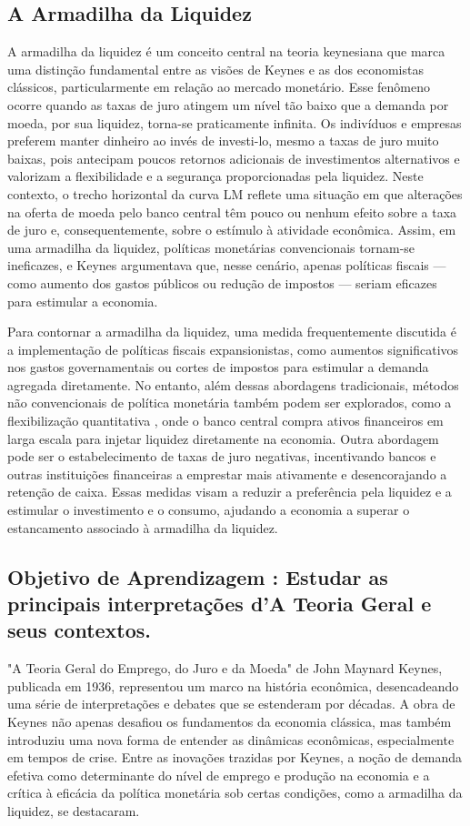 \documentclass[12pt]{article}
\begin{document}
\subsection{\textbf{A Armadilha da Liquidez}}
A armadilha da liquidez é um conceito central na teoria keynesiana que marca uma distinção fundamental entre as visões de Keynes e as dos economistas clássicos, particularmente em relação ao mercado monetário. Esse fenômeno ocorre quando as taxas de juro atingem um nível tão baixo que a demanda por moeda, por sua liquidez, torna-se praticamente infinita. Os indivíduos e empresas preferem manter dinheiro ao invés de investi-lo, mesmo a taxas de juro muito baixas, pois antecipam poucos retornos adicionais de investimentos alternativos e valorizam a flexibilidade e a segurança proporcionadas pela liquidez. Neste contexto, o trecho horizontal da curva LM reflete uma situação em que alterações na oferta de moeda pelo banco central têm pouco ou nenhum efeito sobre a taxa de juro e, consequentemente, sobre o estímulo à atividade econômica. Assim, em uma armadilha da liquidez, políticas monetárias convencionais tornam-se ineficazes, e Keynes argumentava que, nesse cenário, apenas políticas fiscais — como aumento dos gastos públicos ou redução de impostos — seriam eficazes para estimular a economia.

Para contornar a armadilha da liquidez, uma medida frequentemente discutida é a implementação de políticas fiscais expansionistas, como aumentos significativos nos gastos governamentais ou cortes de impostos para estimular a demanda agregada diretamente. No entanto, além dessas abordagens tradicionais, métodos não convencionais de política monetária também podem ser explorados, como a flexibilização quantitativa , onde o banco central compra ativos financeiros em larga escala para injetar liquidez diretamente na economia. Outra abordagem pode ser o estabelecimento de taxas de juro negativas, incentivando bancos e outras instituições financeiras a emprestar mais ativamente e desencorajando a retenção de caixa. Essas medidas visam a reduzir a preferência pela liquidez e a estimular o investimento e o consumo, ajudando a economia a superar o estancamento associado à armadilha da liquidez.

\subsection{\textbf{Objetivo de Aprendizagem : Estudar as principais interpretações d’A Teoria Geral e seus contextos.}}
"A Teoria Geral do Emprego, do Juro e da Moeda" de John Maynard Keynes, publicada em 1936, representou um marco na história econômica, desencadeando uma série de interpretações e debates que se estenderam por décadas. A obra de Keynes não apenas desafiou os fundamentos da economia clássica, mas também introduziu uma nova forma de entender as dinâmicas econômicas, especialmente em tempos de crise. Entre as inovações trazidas por Keynes, a noção de demanda efetiva como determinante do nível de emprego e produção na economia e a crítica à eficácia da política monetária sob certas condições, como a armadilha da liquidez, se destacaram.
\end{document}
